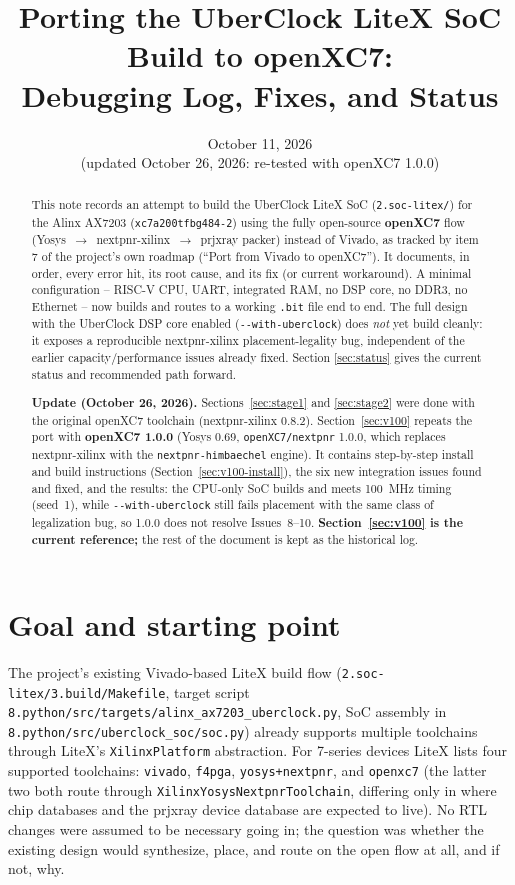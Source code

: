 \documentclass[11pt]{article}
\title{Porting the UberClock LiteX SoC Build to openXC7:\\
Debugging Log, Fixes, and Status}
\author{}
\date{October 11, 2026\\(updated October 26, 2026: re-tested with openXC7 1.0.0)}
\begin{document}
\maketitle

\begin{abstract}
\noindent
This note records an attempt to build the UberClock LiteX SoC
(\lstinline{2.soc-litex/}) for the Alinx AX7203 (\lstinline{xc7a200tfbg484-2})
using the fully open-source \textbf{openXC7} flow
(Yosys~$\to$~nextpnr-xilinx~$\to$~prjxray packer) instead of Vivado, as
tracked by item 7 of the project's own roadmap (``Port from Vivado to
openXC7''). It documents, in order, every error hit, its root cause, and
its fix (or current workaround). A minimal configuration --
RISC-V CPU, UART, integrated RAM, no DSP core, no DDR3, no Ethernet --
now builds and routes to a working \lstinline{.bit} file end to end. The
full design with the UberClock DSP core enabled
(\lstinline{--with-uberclock}) does \emph{not} yet build cleanly: it
exposes a reproducible nextpnr-xilinx placement-legality bug, independent
of the earlier capacity/performance issues already fixed. Section
\ref{sec:status} gives the current status and recommended path forward.

\medskip\noindent
\textbf{Update (October 26, 2026).} Sections~\ref{sec:stage1} and
\ref{sec:stage2} were done with the original openXC7 toolchain
(nextpnr-xilinx 0.8.2). Section~\ref{sec:v100} repeats the port with
\textbf{openXC7 1.0.0} (Yosys 0.69, \lstinline{openXC7/nextpnr} 1.0.0, which
replaces nextpnr-xilinx with the \lstinline{nextpnr-himbaechel} engine). It
contains step-by-step install and build instructions
(Section~\ref{sec:v100-install}), the six new integration issues found and
fixed, and the results: the CPU-only SoC builds and meets 100~MHz timing
(seed~1), while \lstinline{--with-uberclock} still fails placement with the
same class of legalization bug, so 1.0.0 does not resolve
Issues~8--10. \textbf{Section~\ref{sec:v100} is the current reference;}
the rest of the document is kept as the historical log.
\end{abstract}

\tableofcontents

\section{Goal and starting point}

The project's existing Vivado-based LiteX build flow
(\lstinline{2.soc-litex/3.build/Makefile}, target script
\lstinline{8.python/src/targets/alinx_ax7203_uberclock.py}, SoC assembly in
\lstinline{8.python/src/uberclock_soc/soc.py}) already supports multiple
toolchains through LiteX's \lstinline{XilinxPlatform} abstraction. For
7-series devices LiteX lists four supported toolchains:
\lstinline{vivado}, \lstinline{f4pga}, \lstinline{yosys+nextpnr}, and
\lstinline{openxc7} (the latter two both route through
\lstinline{XilinxYosysNextpnrToolchain}, differing only in where chip
databases and the prjxray device database are expected to live). No RTL
changes were assumed to be necessary going in; the question was whether
the existing design would synthesize, place, and route on the open flow
at all, and if not, why.
\end{document}
